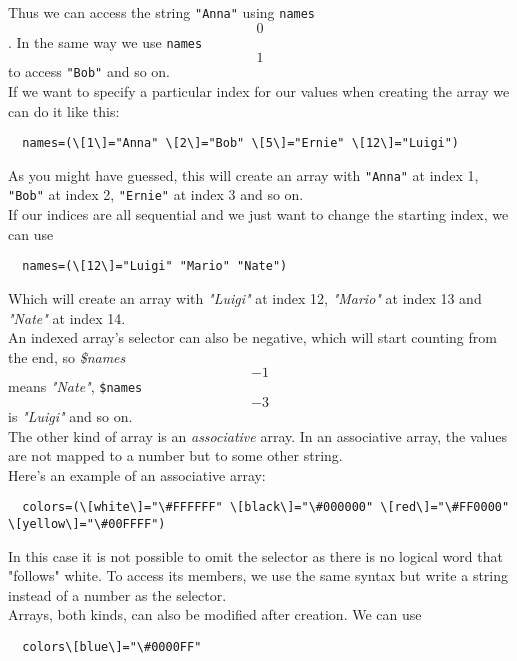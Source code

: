 \documentclass[hidelinks,12pt,a4paper,numbers=enddot]{scrartcl}
\begin{document}
Thus we can access the string \texttt{"Anna"} using \texttt{names\[0\]}.
In the same way we use \texttt{names\[1\]} to access \texttt{"Bob"} and so on.\\

If we want to specify a particular index for our values when creating the array
we can do it like this:

\begin{verbatim}
  names=(\[1\]="Anna" \[2\]="Bob" \[5\]="Ernie" \[12\]="Luigi")
\end{verbatim}

As you might have guessed, this will create an array with \texttt{"Anna"} at index 1,
\texttt{"Bob"} at index 2, \texttt{"Ernie"} at index 3 and so on.\\

If our indices are all sequential and we just want to change the starting index, we can use

\begin{verbatim}
  names=(\[12\]="Luigi" "Mario" "Nate")
\end{verbatim}

Which will create an array with \emph{"Luigi"} at index 12,
\emph{"Mario"} at index 13 and \emph{"Nate"} at index 14.\\
An indexed array's selector can also be negative, which will start counting from the end,
so \emph{\${names\[-1\]}} means \emph{"Nate"}, \texttt{\${names\[-3\]}} is
\emph{"Luigi"} and so on.\\

The other kind of array is an \emph{associative} array.
In an associative array, the values are not mapped to a number but to some other string.\\

Here's an example of an associative array:

\begin{verbatim}
  colors=(\[white\]="\#FFFFFF" \[black\]="\#000000" \[red\]="\#FF0000" \[yellow\]="\#00FFFF")
\end{verbatim}

In this case it is not possible to omit the selector as there is no logical word
that "follows" white. To access its members, we use the same syntax but write a string
instead of a number as the selector.\\
Arrays, both kinds, can also be modified after creation. We can use

\begin{verbatim}
  colors\[blue\]="\#0000FF"
\end{verbatim}
\end{document}

